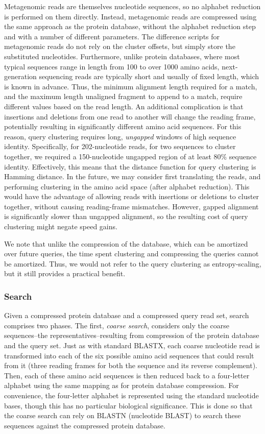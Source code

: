 \documentclass[review,preprint,12pt]{elsarticle}
\theoremstyle{definition}
\theoremstyle{remark}
\numberwithin{equation}{section}
\begin{document}
Metagenomic reads are themselves nucleotide sequences, so no alphabet reduction
is performed on them directly.
Instead, metagenomic reads are compressed using the same approach as the
protein database, without the alphabet reduction step and with a number of
different parameters.
The difference scripts for metagenomic reads do not rely on the cluster offsets,
but simply store the substituted nucleotides.
Furthermore, unlike protein databases, where most typical sequences range in 
length from 100 to over 1000 amino acids, next-generation sequencing reads are 
typically short and usually of fixed length, which is known in advance.
Thus, the minimum alignment length required for a match, and the maximum
length unaligned fragment to append to a match, require different values based
on the read length.
An additional complication is that insertions and deletions from one read to
another will change the reading frame, potentially resulting in significantly
different amino acid sequences.
For this reason, query clustering requires long, \emph{ungapped} windows of high
sequence identity.
Specifically, for 202-nucleotide reads, for two sequences to cluster together,
we required a 150-nucleotide ungapped region of at least 80\% sequence identity.
Effectively, this means that the distance function for query clustering is
Hamming distance.
In the future, we may consider first translating the reads, and performing
clustering in the amino acid space (after alphabet reduction).
This would have the advantage of allowing reads with insertions or deletions
to cluster together, without causing reading-frame mismatches.
However, gapped alignment is significantly slower than ungapped alignment,
so the resulting cost of query clustering might negate speed gains.

We note that unlike the compression of the database, which can be amortized 
over future queries, the time spent clustering and compressing the queries 
cannot be amortized.
Thus, we would not refer to the query clustering as entropy-scaling, but it
still provides a practical benefit.


\subsubsection{Search}

Given a compressed protein database and a compressed query read set, search
comprises two phases.
The first, \emph{coarse search}, considers only the coarse sequences--the
representatives--resulting from compression of the protein database and the
query set.
Just as with standard BLASTX, each coarse nucleotide read is transformed into 
each of the six possible amino acid sequences that could result from it (three 
reading frames for both the sequence and its reverse complement).
Then, each of these amino acid sequences is then reduced back to a four-letter
alphabet using the same mapping as for protein database compression.
For convenience, the four-letter alphabet is represented using the standard
nucleotide bases, though this has no particular biological significance.
This is done so that the coarse search can rely on BLASTN (nucleotide BLAST) to
search these sequences against the compressed protein database.
\end{document}
